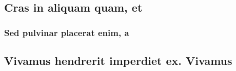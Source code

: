 \chapter{}
\label{cha:789}



\section{Cras in aliquam quam, et}
\label{sec:456}



\subsection{Sed pulvinar placerat enim, a}
\label{sec:00456}



\section{Vivamus hendrerit imperdiet ex. Vivamus}
\label{sec:123}


